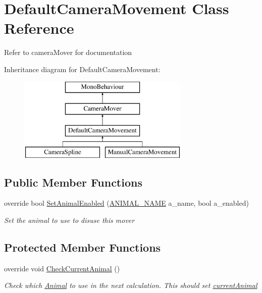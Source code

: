 \hypertarget{class_default_camera_movement}{}\section{Default\+Camera\+Movement Class Reference}
\label{class_default_camera_movement}


Refer to camera\+Mover for documentation  


Inheritance diagram for Default\+Camera\+Movement\+:\begin{figure}[H]
\begin{center}
\leavevmode
\includegraphics[height=4.000000cm]{class_default_camera_movement}
\end{center}
\end{figure}
\subsection*{Public Member Functions}
\begin{DoxyCompactItemize}
\item 
override bool \mbox{\hyperlink{class_default_camera_movement_ad456298793af765ca6218d6951dd4973}{Set\+Animal\+Enabled}} (\mbox{\hyperlink{_animal_8cs_a2fa5713399b84d1b88dae9196837af50}{A\+N\+I\+M\+A\+L\+\_\+\+N\+A\+ME}} a\+\_\+name, bool a\+\_\+enabled)
\begin{DoxyCompactList}\small\item\em Set the animal to use to disuse this mover \end{DoxyCompactList}\end{DoxyCompactItemize}
\subsection*{Protected Member Functions}
\begin{DoxyCompactItemize}
\item 
override void \mbox{\hyperlink{class_default_camera_movement_a27024061b5779124b7fac73acaed7c1d}{Check\+Current\+Animal}} ()
\begin{DoxyCompactList}\small\item\em Check which \mbox{\hyperlink{class_animal}{Animal}} to use in the next calculation. This should set \mbox{\hyperlink{class_camera_mover_a8b863da058e5a1984fd686e09ee2689f}{current\+Animal}} \end{DoxyCompactList}\end{DoxyCompactItemize}
